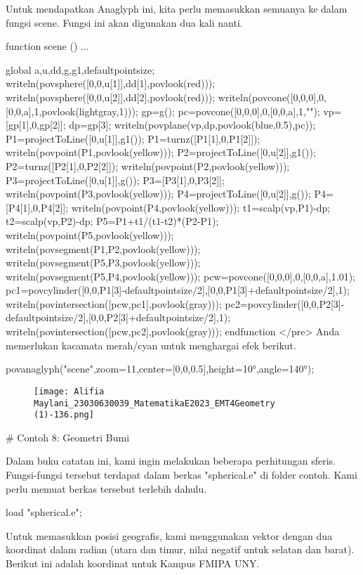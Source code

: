 \documentclass{article}
\begin{document}
Untuk mendapatkan Anaglyph ini, kita perlu memasukkan semuanya ke
dalam fungsi scene. Fungsi ini akan digunakan dua kali nanti.


\>function scene () ...


    global a,u,dd,g,g1,defaultpointsize;
    writeln(povsphere([0,0,u[1]],dd[1],povlook(red)));
    writeln(povsphere([0,0,u[2]],dd[2],povlook(red)));
    writeln(povcone([0,0,0],0,[0,0,a],1,povlook(lightgray,1)));
    gp=g();
    pc=povcone([0,0,0],0,[0,0,a],1,"");
    vp=[gp[1],0,gp[2]]; dp=gp[3];
    writeln(povplane(vp,dp,povlook(blue,0.5),pc));
    P1=projectToLine([0,u[1]],g1()); P1=turnz([P1[1],0,P1[2]]);
    writeln(povpoint(P1,povlook(yellow)));
    P2=projectToLine([0,u[2]],g1()); P2=turnz([P2[1],0,P2[2]]);
    writeln(povpoint(P2,povlook(yellow)));
    P3=projectToLine([0,u[1]],g()); P3=[P3[1],0,P3[2]];
    writeln(povpoint(P3,povlook(yellow)));
    P4=projectToLine([0,u[2]],g()); P4=[P4[1],0,P4[2]];
    writeln(povpoint(P4,povlook(yellow)));
    t1=scalp(vp,P1)-dp; t2=scalp(vp,P2)-dp; P5=P1+t1/(t1-t2)*(P2-P1);
    writeln(povpoint(P5,povlook(yellow)));
    writeln(povsegment(P1,P2,povlook(yellow)));
    writeln(povsegment(P5,P3,povlook(yellow)));
    writeln(povsegment(P5,P4,povlook(yellow)));
    pcw=povcone([0,0,0],0,[0,0,a],1.01);
    pc1=povcylinder([0,0,P1[3]-defaultpointsize/2],[0,0,P1[3]+defaultpointsize/2],1);
    writeln(povintersection([pcw,pc1],povlook(gray)));
    pc2=povcylinder([0,0,P2[3]-defaultpointsize/2],[0,0,P2[3]+defaultpointsize/2],1);
    writeln(povintersection([pcw,pc2],povlook(gray)));
    endfunction
</pre>
Anda memerlukan kacamata merah/cyan untuk menghargai efek berikut.


\>povanaglyph("scene",zoom=11,center=[0,0,0.5],height=10°,angle=140°);


\begin{figure}
    \centering
    \texttt{[image: Alifia Maylani\_23030630039\_MatematikaE2023\_EMT4Geometry (1)-136.png]}
    \caption{}
    \label{fig:enter-label}
\end{figure}

# Contoh 8: Geometri Bumi

Dalam buku catatan ini, kami ingin melakukan beberapa perhitungan
sferis. Fungsi-fungsi tersebut terdapat dalam berkas "spherical.e" di
folder contoh. Kami perlu memuat berkas tersebut terlebih dahulu.


\>load "spherical.e";


Untuk memasukkan posisi geografis, kami menggunakan vektor dengan dua
koordinat dalam radian (utara dan timur, nilai negatif untuk selatan
dan barat). Berikut ini adalah koordinat untuk Kampus FMIPA UNY.
\end{document}
